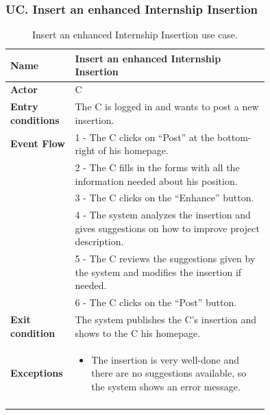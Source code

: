 \subsubsection*{UC\cuc . Insert an enhanced Internship Insertion}
\begin{center}
    \begin{longtable}{|l|p{0.75\linewidth}|}
        \hline
        \textbf{Name}               & Insert an enhanced Internship Insertion\\
        \hline
        \textbf{Actor}              & C\\
        \hline
        \textbf{Entry conditions}   & The C is logged in and wants to post a new insertion.\\
        \hline
        \textbf{Event Flow}         & 1 - The C clicks on “Post” at the bottom-right of his homepage. \\
        & 2 - The C fills in the forms with all the information needed about his position. \\
        & 3 - The C clicks on the “Enhance” button. \\
        & 4 - The system analyzes the insertion and gives suggestions on how to improve project description. \\
        & 5 - The C reviews the suggestions given by the system and modifies the insertion if needed. \\
        & 6 - The C clicks on the “Post” button. \\
        \hline
        \textbf{Exit condition}   & The system publishes the C’s insertion and shows to the C his homepage. \\       
        \hline
        \textbf{Exceptions}       & \begin{itemize}
            \item The insertion is very well-done and there are no suggestions available, so the system shows an error message.
        \end{itemize}\\
        \hline
        \caption{Insert an enhanced Internship Insertion use case.}
        \label{tab: enhanced_internship_insertion_use_case}
    \end{longtable}
\end{center}


